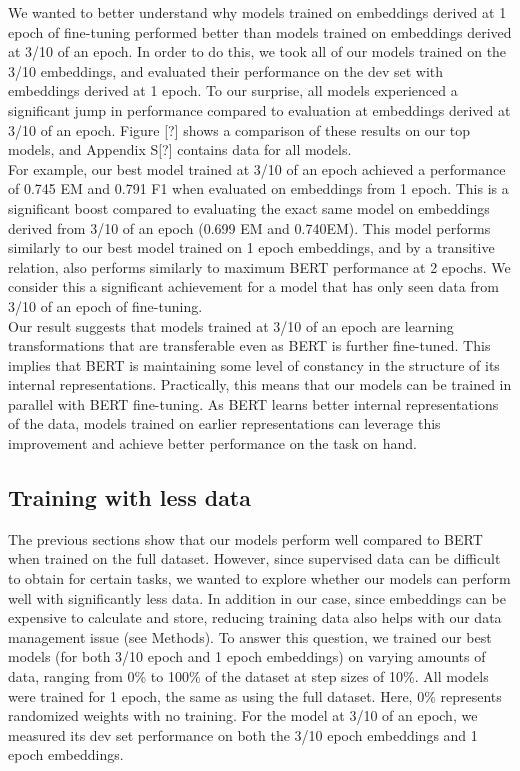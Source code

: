 We wanted to better understand why models trained on embeddings derived at 1 epoch of fine-tuning performed better than models trained on embeddings derived at 3/10 of an epoch. In order to do this, we took all of our models trained on the 3/10 embeddings, and evaluated their performance on the dev set with embeddings derived at 1 epoch. To our surprise, all models experienced a significant jump in performance compared to evaluation at embeddings derived at 3/10 of an epoch. Figure [?] shows a comparison of these results on our top models, and Appendix S[?] contains data for all models.  \\

For example, our best model trained at 3/10 of an epoch achieved a performance of 0.745 EM and 0.791 F1 when evaluated on embeddings from 1 epoch. This is a significant boost compared to evaluating the exact same model on embeddings derived from 3/10 of an epoch (0.699 EM and 0.740EM). This model performs similarly to our best model trained on 1 epoch embeddings, and by a transitive relation, also performs similarly to maximum BERT performance at 2 epochs. We consider this a significant achievement for a model that has only seen data from 3/10 of an epoch of fine-tuning. \\

Our result suggests that models trained at 3/10 of an epoch are learning transformations that are transferable even as BERT is further fine-tuned. This implies that BERT is maintaining some level of constancy in the structure of its internal representations. Practically, this means that our models can be trained in parallel with BERT fine-tuning. As BERT learns better internal representations of the data, models trained on earlier representations can leverage this improvement and achieve better performance on the task on hand. \\

\subsection{Training with less data}

The previous sections show that our models perform well compared to BERT when trained on the full dataset. However, since supervised data can be difficult to obtain for certain tasks, we wanted to explore whether our models can perform well with significantly less data. In addition in our case, since embeddings can be expensive to calculate and store, reducing training data also helps with our data management issue (see Methods). To answer this question, we trained our best models (for both 3/10 epoch and 1 epoch embeddings) on varying amounts of data, ranging from 0\% to 100\% of the dataset at step sizes of 10\%. All models were trained for 1 epoch, the same as using the full dataset. Here, 0\% represents randomized weights with no training. For the model at 3/10 of an epoch, we measured its dev set performance on both the 3/10 epoch embeddings and 1 epoch embeddings.  \\

